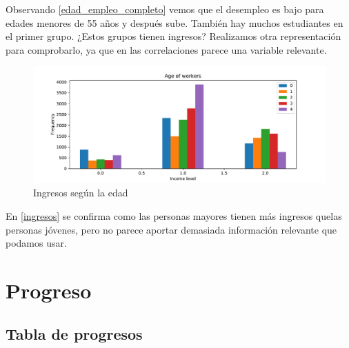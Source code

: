 \documentclass[twoside,openright,titlepage,numbers=noenddot,openany,headinclude,footinclude=true,
cleardoublepage=empty,abstractoff,BCOR=5mm,paper=a4,fontsize=12pt,main=spanish]{scrreprt}
\begin{document}
Observando \eqref{edad_empleo_completo} vemos que el desempleo es bajo para edades menores de 55 años y después sube. También hay muchos estudiantes en el primer grupo. ¿Estos grupos tienen ingresos? Realizamos otra representación para comprobarlo, ya que en las correlaciones parece una variable relevante.

\begin{figure}[H]
\includegraphics[scale=0.5]{edad_segun_income.pdf}
\caption{Ingresos según la edad}
\label{ingresos}
\end{figure}

En \eqref{ingresos} se confirma como las personas mayores tienen más ingresos quelas personas jóvenes, pero no parece aportar demasiada información relevante que podamos usar.

\newpage
\section{Progreso}

\subsection{Tabla de progresos}
\end{document}
